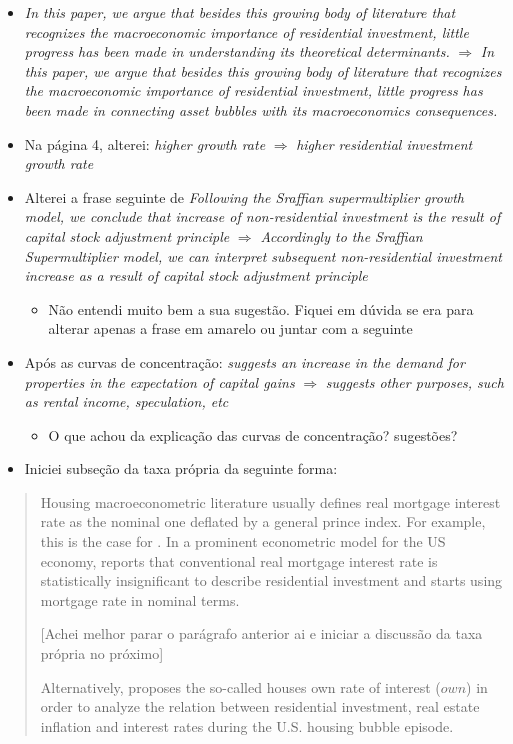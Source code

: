 \documentclass[11pt]{article}
\begin{document}
\begin{itemize}
\item \emph{In this paper, we argue that besides this growing body of literature that recognizes the macroeconomic importance of residential investment, little progress has been made in understanding its theoretical determinants.} \(\Rightarrow\) \emph{In this paper, we argue that besides this growing body of literature that recognizes the macroeconomic importance of residential investment, little progress has been made in connecting asset bubbles with its macroeconomics consequences.}
\item Na página 4, alterei: \emph{higher growth rate} \(\Rightarrow\) \emph{higher residential investment growth rate}
\item Alterei a frase seguinte de \emph{Following the Sraffian supermultiplier growth model, we conclude that increase of non-residential investment is the result of capital stock adjustment principle} \(\Rightarrow\) \emph{Accordingly to the Sraffian Supermultiplier model, we can interpret subsequent non-residential investment increase as a result of capital stock adjustment principle}
\begin{itemize}
\item Não entendi muito bem a sua sugestão. Fiquei em dúvida se era para alterar apenas a frase em amarelo ou juntar com a seguinte
\end{itemize}
\item Após as curvas de concentração: \emph{suggests an increase in the demand for properties in the expectation of capital gains} \(\Rightarrow\) \emph{suggests other purposes, such as rental income, speculation, etc}
\begin{itemize}
\item O que achou da explicação das curvas de concentração? sugestões?
\end{itemize}
\item Iniciei subseção da taxa própria da seguinte forma:
\end{itemize}

\begin{quote}
Housing macroeconometric literature usually defines real mortgage interest rate as the nominal one deflated by a general prince index.
For example, this is the case for \textcites{goodhart_house_2008}{arestis_economic_2019}{huang_is_2020}.
In a prominent econometric model for the US economy, \textcite{fair_macroeconometric_2013} reports that conventional real mortgage interest rate is statistically insignificant to describe residential investment and starts using mortgage rate in nominal terms.

[Achei melhor parar o parágrafo anterior ai e iniciar a discussão da taxa própria no próximo]

Alternatively, \textcite{teixeira_crescimento_2015} proposes the so-called houses own rate of interest (\(own\)) in order to analyze the relation between residential investment, real estate inflation and interest rates during the U.S. housing bubble episode.
\end{quote}
\end{document}
